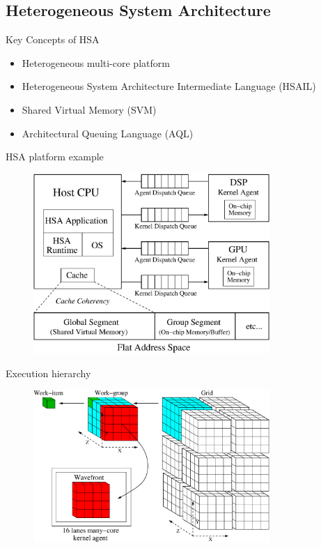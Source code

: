 \documentclass{beamer}
\begin{document}
\begin{CJK}{UTF8}{bkai}
    \subsection{Heterogeneous System Architecture}
    \begin{frame}{Key Concepts of HSA}
       \begin{itemize}
           \item Heterogeneous multi-core platform
           \item Heterogeneous System Architecture Intermediate Language (HSAIL)
           \item Shared Virtual Memory (SVM)
           \item Architectural Queuing Language (AQL)
       \end{itemize} 
    \end{frame}

    \begin{frame}{HSA platform example}
        \begin{figure}[!ht]
            \centering
            \includegraphics[width=0.8\textwidth]{./figs/systemspec.eps}
            \label{fig:systemspec}
        \end{figure}
    \end{frame}

    \begin{frame}{Execution hierarchy}
        \begin{figure}[!ht] 
            \centering
            \includegraphics[width=0.8\textwidth]{./figs/grid.eps}
            \label{fig:grid}
        \end{figure}
    \end{frame}


\end{CJK}
\end{document}
